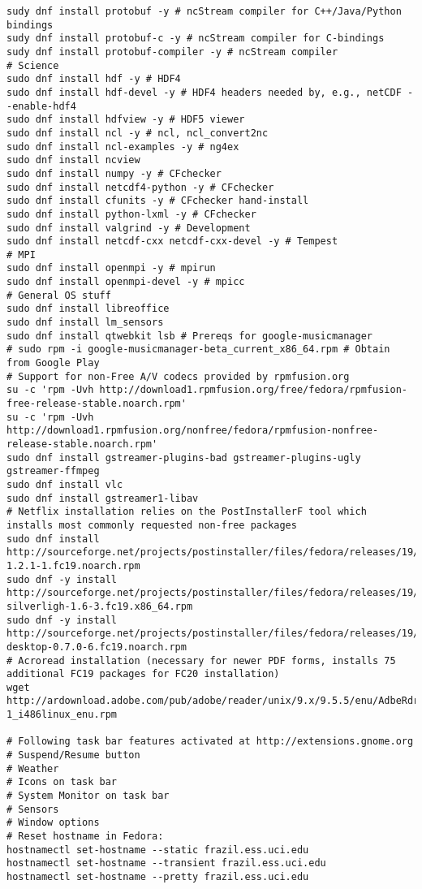 \documentclass[12pt,twoside]{article}
\begin{document}
\begin{verbatim}
sudy dnf install protobuf -y # ncStream compiler for C++/Java/Python bindings
sudy dnf install protobuf-c -y # ncStream compiler for C-bindings
sudy dnf install protobuf-compiler -y # ncStream compiler
# Science
sudo dnf install hdf -y # HDF4
sudo dnf install hdf-devel -y # HDF4 headers needed by, e.g., netCDF --enable-hdf4
sudo dnf install hdfview -y # HDF5 viewer
sudo dnf install ncl -y # ncl, ncl_convert2nc
sudo dnf install ncl-examples -y # ng4ex
sudo dnf install ncview
sudo dnf install numpy -y # CFchecker
sudo dnf install netcdf4-python -y # CFchecker
sudo dnf install cfunits -y # CFchecker hand-install
sudo dnf install python-lxml -y # CFchecker
sudo dnf install valgrind -y # Development
sudo dnf install netcdf-cxx netcdf-cxx-devel -y # Tempest
# MPI
sudo dnf install openmpi -y # mpirun
sudo dnf install openmpi-devel -y # mpicc
# General OS stuff
sudo dnf install libreoffice
sudo dnf install lm_sensors
sudo dnf install qtwebkit lsb # Prereqs for google-musicmanager
# sudo rpm -i google-musicmanager-beta_current_x86_64.rpm # Obtain from Google Play
# Support for non-Free A/V codecs provided by rpmfusion.org
su -c 'rpm -Uvh http://download1.rpmfusion.org/free/fedora/rpmfusion-free-release-stable.noarch.rpm'
su -c 'rpm -Uvh http://download1.rpmfusion.org/nonfree/fedora/rpmfusion-nonfree-release-stable.noarch.rpm'
sudo dnf install gstreamer-plugins-bad gstreamer-plugins-ugly gstreamer-ffmpeg
sudo dnf install vlc
sudo dnf install gstreamer1-libav
# Netflix installation relies on the PostInstallerF tool which installs most commonly requested non-free packages
sudo dnf install http://sourceforge.net/projects/postinstaller/files/fedora/releases/19/x86_64/updates/postinstallerf-1.2.1-1.fc19.noarch.rpm 
sudo dnf -y install http://sourceforge.net/projects/postinstaller/files/fedora/releases/19/x86_64/updates/wine-silverligh-1.6-3.fc19.x86_64.rpm
sudo dnf -y install http://sourceforge.net/projects/postinstaller/files/fedora/releases/19/x86_64/updates/netflix-desktop-0.7.0-6.fc19.noarch.rpm
# Acroread installation (necessary for newer PDF forms, installs 75 additional FC19 packages for FC20 installation)
wget http://ardownload.adobe.com/pub/adobe/reader/unix/9.x/9.5.5/enu/AdbeRdr9.5.5-1_i486linux_enu.rpm

# Following task bar features activated at http://extensions.gnome.org
# Suspend/Resume button
# Weather
# Icons on task bar
# System Monitor on task bar
# Sensors
# Window options
# Reset hostname in Fedora:
hostnamectl set-hostname --static frazil.ess.uci.edu
hostnamectl set-hostname --transient frazil.ess.uci.edu
hostnamectl set-hostname --pretty frazil.ess.uci.edu
\end{verbatim}
\end{document}
